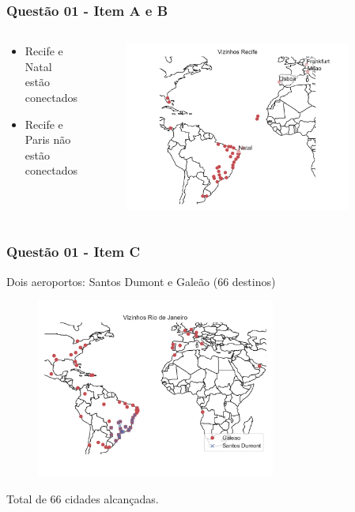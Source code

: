 \documentclass[aspectratio=169,usenames,dvipsnames]{beamer}
\begin{document}
\begin{frame}
  \frametitle{Questão 01 - Item A e B}
  \begin{columns}
    \begin{column}{0.3\textwidth}
      \begin{itemize}
        \item Recife e Natal estão conectados
        \item Recife e Paris não estão conectados
      \end{itemize}
    \end{column}
    \begin{column}{0.7\textwidth}
      \begin{figure}
        \includegraphics[width=0.9\textwidth]{figs/vizinhos_recife.pdf}
      \end{figure}
    \end{column}
  \end{columns}
\end{frame}

\begin{frame}
  \frametitle{Questão 01 - Item C}
  Dois aeroportos: Santos Dumont e Galeão (66 destinos)
  
  \begin{figure}
    \includegraphics[width=0.7\textwidth]{figs/vizinhos_rio_de_janeiro.pdf}
  \end{figure}

  Total de 66 cidades alcançadas.
\end{frame}
\end{document}
